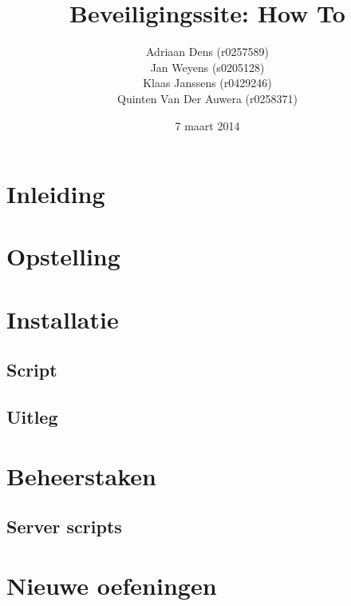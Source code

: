 \documentclass[a4paper,11pt]{report}
\begin{document}
\title{Beveiligingssite: How To}
\date{7 maart 2014}
\author{Adriaan Dens (r0257589)\\
	Jan Weyens (s0205128)\\
	Klaas Janssens (r0429246)\\
	Quinten Van Der Auwera (r0258371)
}	

\maketitle

\tableofcontents

\chapter{Inleiding}

\newpage

\chapter{Opstelling}

\newpage

\chapter{Installatie}

\section{Script}

\section{Uitleg}

\newpage

\chapter{Beheerstaken}
\section{Server scripts}


\chapter{Nieuwe oefeningen}

\end{document}
